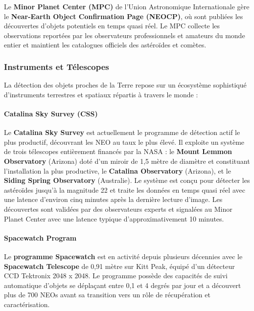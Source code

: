 \documentclass[11pt]{article}
\begin{document}
Le \textbf{Minor Planet Center (MPC)} de l'Union Astronomique
Internationale gère le \textbf{Near-Earth Object Confirmation Page
  (NEOCP)}, où sont publiées les découvertes d'objets potentiels en temps
quasi réel. Le MPC collecte les observations reportées par les
observateurs professionnels et amateurs du monde entier et maintient les
catalogues officiels des astéroïdes et comètes.

\subsubsection{Instruments et
  Télescopes}\label{instruments-et-tuxe9lescopes}

La détection des objets proches de la Terre repose sur un écosystème
sophistiqué d'instruments terrestres et spatiaux répartis à travers le
monde :

\paragraph{Catalina Sky Survey (CSS)}\label{catalina-sky-survey-css}

Le \textbf{Catalina Sky Survey} est actuellement le programme de
détection actif le plus productif, découvrant les NEO au taux le plus
élevé. Il exploite un système de trois télescopes entièrement financés
par la NASA : le \textbf{Mount Lemmon Observatory} (Arizona) doté d'un
miroir de 1,5 mètre de diamètre et constituant l'installation la plus
productive, le \textbf{Catalina Observatory} (Arizona), et le
\textbf{Siding Spring Observatory} (Australie). Le système est conçu
pour détecter les astéroïdes jusqu'à la magnitude 22 et traite les
données en temps quasi réel avec une latence d'environ cinq minutes
après la dernière lecture d'image. Les découvertes sont validées par des
observateurs experts et signalées au Minor Planet Center avec une
latence typique d'approximativement 10 minutes.

\paragraph{Spacewatch Program}\label{spacewatch-program}

Le \textbf{programme Spacewatch} est en activité depuis plusieurs
décennies avec le \textbf{Spacewatch Telescope} de 0,91 mètre sur Kitt
Peak, équipé d'un détecteur CCD Tektronix 2048 x 2048. Le programme
possède des capacités de suivi automatique d'objets se déplaçant entre
0,1 et 4 degrés par jour et a découvert plus de 700 NEOs avant sa
transition vers un rôle de récupération et caractérisation.
\end{document}
